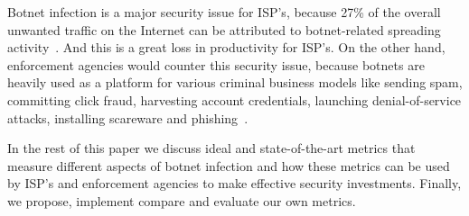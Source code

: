 Botnet infection is a major security issue for ISP's, because 27\% of the overall unwanted traffic on the Internet can be attributed to botnet-related spreading activity~\cite{AM2006}. And this is a great loss in productivity for ISP's. On the other hand, enforcement agencies would counter this security issue, because botnets are heavily used as a platform for various criminal business models like sending spam, committing click fraud, harvesting account credentials, launching denial-of-service attacks, installing scareware and phishing~\cite{AR2013}.

In the rest of this paper we discuss ideal and state-of-the-art metrics that measure different aspects of botnet infection and how these metrics can be used by ISP's and enforcement agencies to make effective security investments. Finally, we propose, implement compare and evaluate our own metrics.


